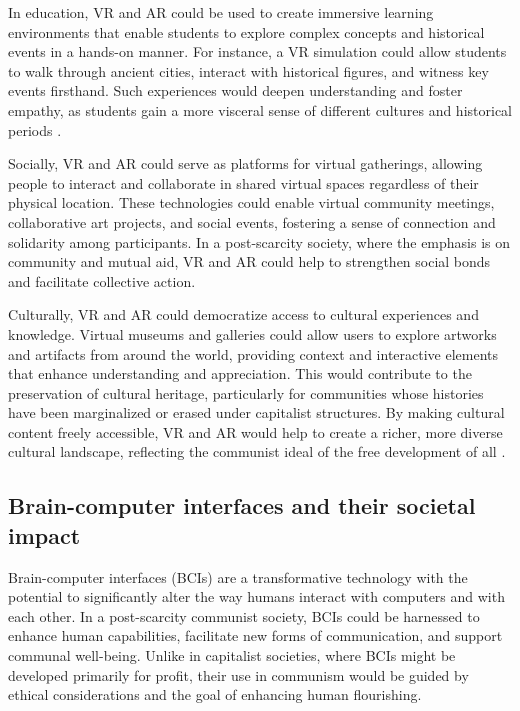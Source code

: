 In education, VR and AR could be used to create immersive learning environments that enable students to explore complex concepts and historical events in a hands-on manner. For instance, a VR simulation could allow students to walk through ancient cities, interact with historical figures, and witness key events firsthand. Such experiences would deepen understanding and foster empathy, as students gain a more visceral sense of different cultures and historical periods \cite[pp.~132-135]{lenin1920}.

Socially, VR and AR could serve as platforms for virtual gatherings, allowing people to interact and collaborate in shared virtual spaces regardless of their physical location. These technologies could enable virtual community meetings, collaborative art projects, and social events, fostering a sense of connection and solidarity among participants. In a post-scarcity society, where the emphasis is on community and mutual aid, VR and AR could help to strengthen social bonds and facilitate collective action.

Culturally, VR and AR could democratize access to cultural experiences and knowledge. Virtual museums and galleries could allow users to explore artworks and artifacts from around the world, providing context and interactive elements that enhance understanding and appreciation. This would contribute to the preservation of cultural heritage, particularly for communities whose histories have been marginalized or erased under capitalist structures. By making cultural content freely accessible, VR and AR would help to create a richer, more diverse cultural landscape, reflecting the communist ideal of the free development of all \cite[pp.~203-205]{mies1986}.

\subsection{Brain-computer interfaces and their societal impact}

Brain-computer interfaces (BCIs) are a transformative technology with the potential to significantly alter the way humans interact with computers and with each other. In a post-scarcity communist society, BCIs could be harnessed to enhance human capabilities, facilitate new forms of communication, and support communal well-being. Unlike in capitalist societies, where BCIs might be developed primarily for profit, their use in communism would be guided by ethical considerations and the goal of enhancing human flourishing.

